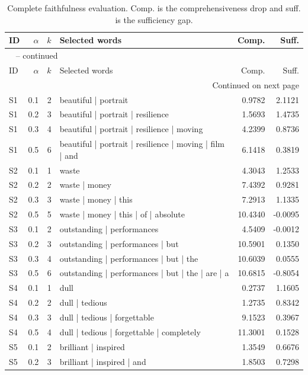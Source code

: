 \begin{longtable}{@{}lrrp{}rr@{}}
\caption{Complete faithfulness evaluation. Comp. is the comprehensiveness drop and suff. is the sufficiency gap.}\label{tab:faithfulness-detail}\\
\toprule
ID & $\alpha$ & $k$ & Selected words & Comp. & Suff. \\
\midrule
\endfirsthead
\multicolumn{6}{l}{\tablename\ \thetable{} -- continued}\\
\toprule
ID & $\alpha$ & $k$ & Selected words & Comp. & Suff. \\
\midrule
\endhead
\midrule\multicolumn{6}{r}{Continued on next page}\\
\endfoot
\bottomrule
\endlastfoot
S1 & 0.1 & 2 & beautiful | portrait & 0.9782 & 2.1121 \\
S1 & 0.2 & 3 & beautiful | portrait | resilience & 1.5693 & 1.4735 \\
S1 & 0.3 & 4 & beautiful | portrait | resilience | moving & 4.2399 & 0.8736 \\
S1 & 0.5 & 6 & beautiful | portrait | resilience | moving | film | and & 6.1418 & 0.3819 \\
S2 & 0.1 & 1 & waste & 4.3043 & 1.2533 \\
S2 & 0.2 & 2 & waste | money & 7.4392 & 0.9281 \\
S2 & 0.3 & 3 & waste | money | this & 7.2913 & 1.1335 \\
S2 & 0.5 & 5 & waste | money | this | of | absolute & 10.4340 & -0.0095 \\
S3 & 0.1 & 2 & outstanding | performances & 4.5409 & -0.0012 \\
S3 & 0.2 & 3 & outstanding | performances | but & 10.5901 & 0.1350 \\
S3 & 0.3 & 4 & outstanding | performances | but | the & 10.6039 & 0.0555 \\
S3 & 0.5 & 6 & outstanding | performances | but | the | are | a & 10.6815 & -0.8054 \\
S4 & 0.1 & 1 & dull & 0.2737 & 1.1605 \\
S4 & 0.2 & 2 & dull | tedious & 1.2735 & 0.8342 \\
S4 & 0.3 & 3 & dull | tedious | forgettable & 9.1523 & 0.3967 \\
S4 & 0.5 & 4 & dull | tedious | forgettable | completely & 11.3001 & 0.1528 \\
S5 & 0.1 & 2 & brilliant | inspired & 1.3549 & 0.6676 \\
S5 & 0.2 & 3 & brilliant | inspired | and & 1.8503 & 0.7298 \\

\end{longtable}
